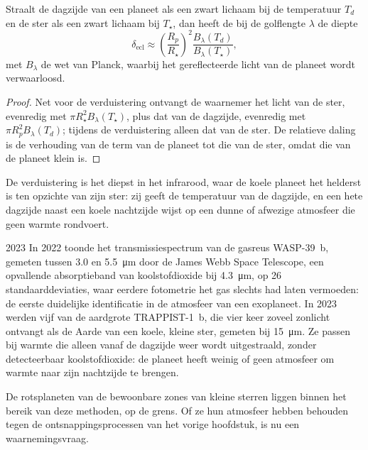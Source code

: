 \begin{proposition}\label{prop:b3:exoplanets:eclipse}
Straalt de dagzijde van een planeet als een zwart lichaam bij de temperatuur
$T_d$ en de ster als een zwart lichaam bij $T_\star$, dan heeft de 
bij de golflengte $\lambda$ de diepte
\[
\delta_\mathrm{ecl} \approx \left(\frac{R_p}{R_\star}\right)^2
  \frac{B_\lambda(T_d)}{B_\lambda(T_\star)},
\]
met $B_\lambda$ de wet van Planck, waarbij het gereflecteerde licht van de planeet wordt verwaarloosd.
\end{proposition}

\begin{proof}
Net voor de verduistering ontvangt de waarnemer het licht van de ster, evenredig met
$\pi R_\star^2 B_\lambda(T_\star)$, plus dat van de dagzijde, evenredig met
$\pi R_p^2 B_\lambda(T_d)$; tijdens de verduistering alleen dat van de ster. De relatieve
daling is de verhouding van de term van de planeet tot die van de ster,
omdat die van de planeet klein is.
\end{proof}

De verduistering is het diepst in het infrarood, waar de koele planeet het
helderst is ten opzichte van zijn ster: zij geeft de temperatuur van de dagzijde, en
een hete dagzijde naast een koele nachtzijde wijst op een dunne of afwezige
atmosfeer die geen warmte rondvoert.

\begin{dated}{2023}
In 2022 toonde het transmissiespectrum van de gasreus WASP-39~b, gemeten
tussen 3.0 en \qty{5.5}{\micro m} door de James Webb Space Telescope,
een opvallende absorptieband van koolstofdioxide bij
\qty{4.3}{\micro m}, op 26 standaarddeviaties, waar eerdere fotometrie het gas
slechts had laten vermoeden: de eerste duidelijke identificatie in de atmosfeer van een
exoplaneet. In 2023 werden vijf  van de
aardgrote TRAPPIST-1~b, die vier keer zoveel zonlicht ontvangt als de Aarde
van een koele, kleine ster, gemeten bij \qty{15}{\micro m}. Ze passen bij
warmte die alleen vanaf de dagzijde weer wordt uitgestraald, zonder detecteerbaar
koolstofdioxide: de planeet heeft weinig of geen atmosfeer om warmte naar zijn
nachtzijde te brengen.
\end{dated}

De rotsplaneten van de bewoonbare zones van kleine sterren liggen binnen het bereik van deze methoden, op de grens.
Of ze hun atmosfeer hebben behouden tegen de ontsnappingsprocessen
van het vorige hoofdstuk, is nu
een waarnemingsvraag.


